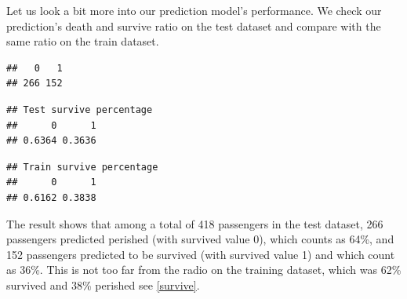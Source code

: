 \documentclass[
]{book}
\newenvironment{Shaded}{\begin{snugshade}}{\end{snugshade}}
\newcommand{\CommentTok}[1]{\textcolor[rgb]{0.56,0.35,0.01}{\textit{#1}}}
\newcommand{\DataTypeTok}[1]{\textcolor[rgb]{0.13,0.29,0.53}{#1}}
\newcommand{\KeywordTok}[1]{\textcolor[rgb]{0.13,0.29,0.53}{\textbf{#1}}}
\newcommand{\NormalTok}[1]{#1}
\newcommand{\OperatorTok}[1]{\textcolor[rgb]{0.81,0.36,0.00}{\textbf{#1}}}
\newcommand{\StringTok}[1]{\textcolor[rgb]{0.31,0.60,0.02}{#1}}
\begin{document}
Let us look a bit more into our prediction model's performance. We check our prediction's death and survive ratio on the test dataset and compare with the same ratio on the train dataset.

\begin{Shaded}
\end{Shaded}

\begin{verbatim}
##   0   1 
## 266 152
\end{verbatim}

\begin{Shaded}
\end{Shaded}

\begin{verbatim}
## Test survive percentage
##      0      1 
## 0.6364 0.3636
\end{verbatim}

\begin{Shaded}
\end{Shaded}

\begin{verbatim}
## Train survive percentage
##      0      1 
## 0.6162 0.3838
\end{verbatim}

The result shows that among a total of 418 passengers in the test dataset, 266 passengers predicted perished (with survived value 0), which counts as 64\%, and 152 passengers predicted to be survived (with survived value 1) and which count as 36\%. This is not too far from the radio on the training dataset, which was 62\% survived and 38\% perished see \ref{survive}.
\end{document}
